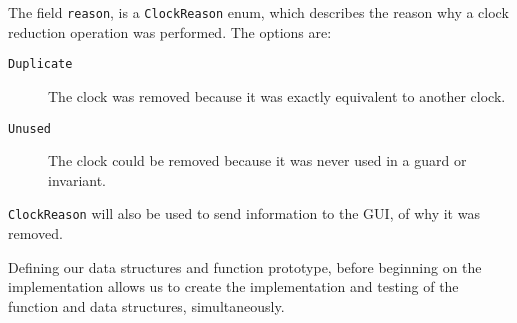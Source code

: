 The field \texttt{reason}, is a \texttt{ClockReason} enum, which describes the reason why a clock reduction operation was performed. The options are:
\begin{description}
\item[\texttt{Duplicate}] The clock was removed because it was exactly equivalent to another clock.
\item[\texttt{Unused}] The clock could be removed because it was never used in a guard or invariant.
\end{description}

\texttt{ClockReason} will also be used to send information to the GUI, of why it was removed.

Defining our data structures and function prototype, before beginning on the implementation allows us to create the implementation and testing of the function and data structures, simultaneously. 
%
%
%
%
%
%
%
%
%
%
%
%
%
%
%
%

